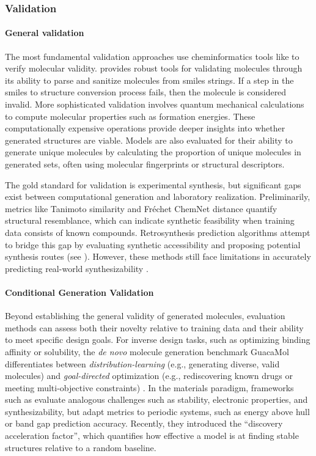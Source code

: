 \subsubsection{Validation}
\paragraph{General validation} The most fundamental validation approaches use cheminformatics tools like  to verify molecular validity.  provides robust tools for validating molecules through its ability to parse and sanitize molecules from \gls{smiles} strings. 
If a step in the \gls{smiles} to structure conversion process fails, then the molecule is considered invalid. More sophisticated validation involves quantum mechanical calculations to compute molecular properties such as formation energies\autocite{kingsbury2022flexible}. These computationally expensive operations provide deeper insights into whether generated structures are viable. Models are also evaluated for their ability to generate unique molecules by calculating the proportion of unique molecules in generated sets, often using molecular fingerprints or structural descriptors. 

The gold standard for validation is experimental synthesis, but significant gaps exist between computational generation and laboratory realization. Preliminarily, metrics like Tanimoto similarity and Fréchet ChemNet distance \autocite{preuer2018frechet} quantify structural resemblance, which can indicate synthetic feasibility when training data consists of known compounds. Retrosynthesis prediction algorithms attempt to bridge this gap by evaluating synthetic accessibility and proposing potential synthesis routes (see ). 
However, these methods still face limitations in accurately predicting real-world synthesizability \autocite{zunger2019beware}.


\paragraph{Conditional Generation Validation} Beyond establishing the general validity of generated molecules, evaluation methods can assess both their novelty relative to training data and their ability to meet specific design goals. For inverse design tasks, such as optimizing binding affinity or solubility, the \textit{de novo} molecule generation benchmark GuacaMol differentiates between \textit{distribution-learning} (e.g., generating diverse, valid molecules) and \textit{goal-directed} optimization (e.g., rediscovering known drugs or meeting multi-objective constraints) \autocite{brown2019guacamol}. 
In the materials paradigm, frameworks such as  evaluate analogous challenges such as stability, electronic properties, and synthesizability, but adapt metrics to periodic systems, such as energy above hull or band gap prediction accuracy\autocite{riebesell2025framework}. Recently, they introduced the \enquote{discovery acceleration factor}, which quantifies how effective a model is at finding stable structures relative to a random baseline.

